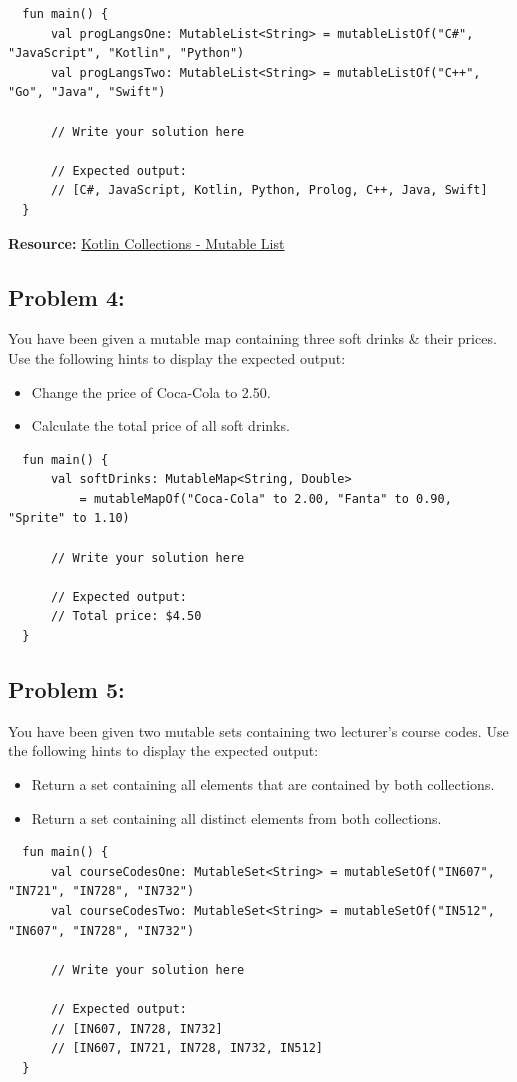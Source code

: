 \documentclass{article}
\begin{document}
\begin{verbatim}
  fun main() {
      val progLangsOne: MutableList<String> = mutableListOf("C#", "JavaScript", "Kotlin", "Python")
      val progLangsTwo: MutableList<String> = mutableListOf("C++", "Go", "Java", "Swift")
    
      // Write your solution here
    
      // Expected output:
      // [C#, JavaScript, Kotlin, Python, Prolog, C++, Java, Swift]
  }
\end{verbatim}

\textbf{Resource:} \href{https://kotlinlang.org/api/latest/jvm/stdlib/kotlin.collections/-mutable-list/}{Kotlin Collections - Mutable List}

\subsection*{Problem 4:} You have been given a mutable map containing three soft drinks \& their prices. Use the following hints to display the expected output:
\begin{itemize}
  \item Change the price of Coca-Cola to 2.50.
  \item Calculate the total price of all soft drinks.
\end{itemize}

\begin{verbatim}
  fun main() {
      val softDrinks: MutableMap<String, Double> 
          = mutableMapOf("Coca-Cola" to 2.00, "Fanta" to 0.90, "Sprite" to 1.10)

      // Write your solution here

      // Expected output:
      // Total price: $4.50
  }
\end{verbatim}

\subsection*{Problem 5:} You have been given two mutable sets containing two lecturer's course codes. Use the following hints to display the expected output:
\begin{itemize}
  \item Return a set containing all elements that are contained by both collections. 
  \item Return a set containing all distinct elements from both collections.
\end{itemize}

\begin{verbatim}
  fun main() {
      val courseCodesOne: MutableSet<String> = mutableSetOf("IN607", "IN721", "IN728", "IN732")
      val courseCodesTwo: MutableSet<String> = mutableSetOf("IN512", "IN607", "IN728", "IN732")

      // Write your solution here

      // Expected output:
      // [IN607, IN728, IN732]
      // [IN607, IN721, IN728, IN732, IN512] 
  }
\end{verbatim}
\end{document}
